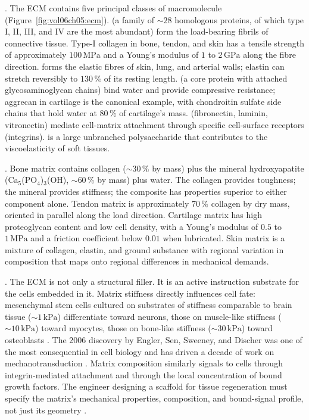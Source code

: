 . The ECM contains five principal
classes of macromolecule (Figure~\ref{fig:vol06ch05:ecm}).
 (a family of $\sim 28$
homologous proteins, of which type I, II, III, and IV are the most
abundant) form the load-bearing fibrils of connective tissue. Type-I
collagen in bone, tendon, and skin has a tensile strength of
approximately $100\,\text{MPa}$ and a Young's modulus of $1$ to
$2\,\text{GPa}$ along the fibre direction.  forms
the elastic fibres of skin, lung, and arterial walls; elastin can
stretch reversibly to $130\,\%$ of its resting length. 
(a core protein with attached glycosaminoglycan chains) bind water
and provide compressive resistance; aggrecan in cartilage is the
canonical example, with chondroitin sulfate side chains that hold
water at $80\,\%$ of cartilage's mass. 
(fibronectin, laminin, vitronectin) mediate cell-matrix attachment
through specific cell-surface receptors (integrins).  is a large unbranched polysaccharide that contributes to the
viscoelasticity of soft tissues.



. Bone matrix contains collagen
($\sim 30\,\%$ by mass) plus the mineral hydroxyapatite
(Ca$_5$(PO$_4$)$_3$(OH), $\sim 60\,\%$ by mass) plus water. The
collagen provides toughness; the mineral provides stiffness; the
composite has properties superior to either component alone. Tendon
matrix is approximately $70\,\%$ collagen by dry mass, oriented in
parallel along the load direction. Cartilage matrix has high
proteoglycan content and low cell density, with a Young's modulus
of $0.5$ to $1\,\text{MPa}$ and a friction coefficient below
$0.01$ when lubricated. Skin matrix is a mixture of collagen,
elastin, and ground substance with regional variation in composition
that maps onto regional differences in mechanical demands.

. The ECM is not only a
structural filler. It is an active instruction substrate for the
cells embedded in it. Matrix stiffness directly influences cell fate:
mesenchymal stem cells cultured on substrates of stiffness comparable
to brain tissue ($\sim 1\,\text{kPa}$) differentiate toward neurons,
those on muscle-like stiffness ($\sim 10\,\text{kPa}$) toward
myocytes, those on bone-like stiffness ($\sim 30\,\text{kPa}$) toward
osteoblasts \cite{paper:v6c05-engler-stiffness-2006}. The 2006
discovery by Engler, Sen, Sweeney, and Discher was one of the most
consequential in cell biology and has driven a decade of work on
mechanotransduction \cite{paper:v6c05-discher-mechanotransduction-2009,
paper:v6c05-peyton-stiffness-review-2007}. Matrix composition
similarly signals to cells through integrin-mediated attachment and
through the local concentration of bound growth factors. The engineer
designing a scaffold for tissue regeneration must specify the
matrix's mechanical properties, composition, and bound-signal
profile, not just its geometry
\cite[ch.~24]{text:v6c05-langer-vacanti-tissue-2014}.


